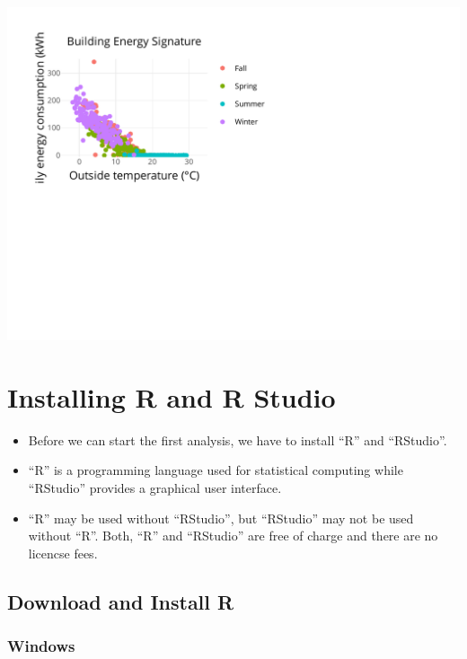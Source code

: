 \documentclass[
]{book}
\providecommand{\tightlist}{%
  \setlength{\itemsep}{0pt}\setlength{\parskip}{0pt}}
\begin{document}
\includegraphics{Energy-Data-Analysis-with-R_files/figure-latex/energysignature plotly-1.pdf}

\hypertarget{appendix-appendix}{%
\appendix}


\hypertarget{installation}{%
\chapter{Installing R and R Studio}\label{installation}}

\begin{itemize}
\tightlist
\item
  Before we can start the first analysis, we have to install ``R'' and ``RStudio''.
\item
  ``R'' is a programming language used for statistical computing while ``RStudio'' provides a graphical user interface.
\item
  ``R'' may be used without ``RStudio'', but ``RStudio'' may not be used without ``R''. Both, ``R'' and ``RStudio'' are free of charge and there are no licencse fees.
\end{itemize}

\hypertarget{download-and-install-r}{%
\section{Download and Install R}\label{download-and-install-r}}

\hypertarget{windows}{%
\subsection{Windows}\label{windows}}
\end{document}
